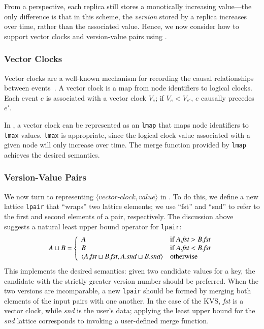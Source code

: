 From a \lang perspective, each replica still stores a monotically increasing
value---the only difference is that in this scheme, the \emph{version} stored by
a replica increases over time, rather than the associated value. Hence, we now
consider how to support vector clocks and version-value pairs using \lang.

\subsubsection{Vector Clocks}
Vector clocks are a well-known mechanism for recording the causal relationships
between events~\cite{Fidge1988}. A vector clock is a map from node identifiers
to logical clocks. Each event $e$ is associated with a vector clock $V_e$; if
$V_e < V_{e'}$, $e$ causally precedes $e'$.

In \lang, a vector clock can be represented as an \texttt{lmap} that maps node
identifiers to \texttt{lmax} values. \texttt{lmax} is appropriate, since the
logical clock value associated with a given node will only increase over
time. The merge function provided by \texttt{lmap} achieves the desired
semantics.

\subsubsection{Version-Value Pairs}
We now turn to representing $\langle\textit{vector-clock},\textit{value}\rangle$
in \lang. To do this, we define a new lattice \texttt{lpair} that ``wraps'' two
lattice elements; we use ``fst'' and ``snd'' to refer to the first and second
elements of a pair, respectively. The discussion above suggests a natural least
upper bound operator for \texttt{lpair}:
\begin{displaymath}
  A \sqcup B = \left\{
    \begin{array}{l l}
      A & \textrm{if } A.\textit{fst} > B.\textit{fst} \\
      B & \textrm{if } A.\textit{fst} < B.\textit{fst} \\
      \langle A.\textit{fst} \sqcup B.\textit{fst}, A.\textit{snd} \sqcup B.\textit{snd}\rangle & \textrm{otherwise} \\
    \end{array} \right. 
\end{displaymath}
This implements the desired semantics: given two candidate values for a key, the
candidate with the strictly greater version number should be preferred. When the
two versions are incomparable, a new \texttt{lpair} should be formed by merging
both elements of the input pairs with one another. In the case of the KVS,
\emph{fst} is a vector clock, while \emph{snd} is the user's data; applying the
least upper bound for the \emph{snd} lattice corresponds to invoking a
user-defined merge function.


